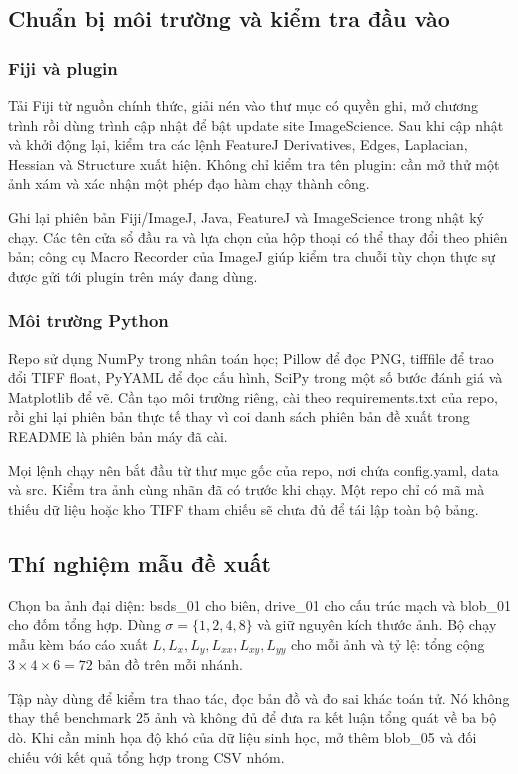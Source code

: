 \subsection{Chuẩn bị môi trường và kiểm tra đầu vào}
\subsubsection{Fiji và plugin}
Tải Fiji từ nguồn chính thức, giải nén vào thư mục có quyền ghi, mở chương trình rồi dùng trình cập nhật để bật update site ImageScience. Sau khi cập nhật và khởi động lại, kiểm tra các lệnh FeatureJ Derivatives, Edges, Laplacian, Hessian và Structure xuất hiện. Không chỉ kiểm tra tên plugin: cần mở thử một ảnh xám và xác nhận một phép đạo hàm chạy thành công.

Ghi lại phiên bản Fiji/ImageJ, Java, FeatureJ và ImageScience trong nhật ký chạy. Các tên cửa sổ đầu ra và lựa chọn của hộp thoại có thể thay đổi theo phiên bản; công cụ Macro Recorder của ImageJ giúp kiểm tra chuỗi tùy chọn thực sự được gửi tới plugin trên máy đang dùng.

\subsubsection{Môi trường Python}
Repo sử dụng NumPy trong nhân toán học; Pillow để đọc PNG, tifffile để trao đổi TIFF float, PyYAML để đọc cấu hình, SciPy trong một số bước đánh giá và Matplotlib để vẽ. Cần tạo môi trường riêng, cài theo requirements.txt của repo, rồi ghi lại phiên bản thực tế thay vì coi danh sách phiên bản đề xuất trong README là phiên bản máy đã cài.

Mọi lệnh chạy nên bắt đầu từ thư mục gốc của repo, nơi chứa config.yaml, data và src. Kiểm tra ảnh cùng nhãn đã có trước khi chạy. Một repo chỉ có mã mà thiếu dữ liệu hoặc kho TIFF tham chiếu sẽ chưa đủ để tái lập toàn bộ bảng.

\subsection{Thí nghiệm mẫu đề xuất}
Chọn ba ảnh đại diện: bsds\_01 cho biên, drive\_01 cho cấu trúc mạch và blob\_01 cho đốm tổng hợp. Dùng $\sigma=\{1,2,4,8\}$ và giữ nguyên kích thước ảnh. Bộ chạy mẫu kèm báo cáo xuất $L,L_x,L_y,L_{xx},L_{xy},L_{yy}$ cho mỗi ảnh và tỷ lệ: tổng cộng $3\times4\times6=72$ bản đồ trên mỗi nhánh.

Tập này dùng để kiểm tra thao tác, đọc bản đồ và đo sai khác toán tử. Nó không thay thế benchmark 25 ảnh và không đủ để đưa ra kết luận tổng quát về ba bộ dò. Khi cần minh họa độ khó của dữ liệu sinh học, mở thêm blob\_05 và đối chiếu với kết quả tổng hợp trong CSV nhóm.

